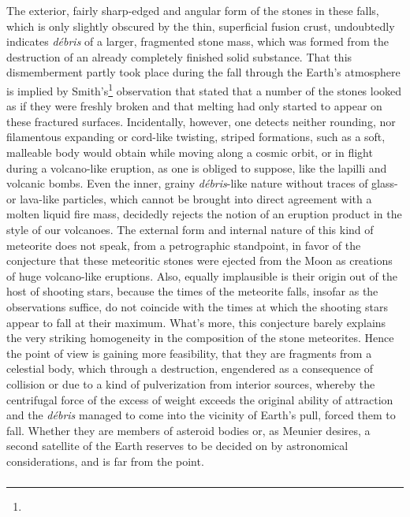 \documentclass[a4paper, 12pt, oneside]{article}
\begin{document}
The exterior, fairly sharp-edged and angular form of the stones in these falls, which is only slightly obscured by the thin, superficial fusion crust, undoubtedly indicates \emph{débris} of a larger, fragmented stone mass, which was formed from the destruction of an already completely finished solid substance. That this dismemberment partly took place during the fall through the Earth's atmosphere is implied by Smith's\footnote{} observation that stated that a number of the stones looked as if they were freshly broken and that melting had only started to appear on these fractured surfaces. Incidentally, however, one detects neither rounding, nor filamentous expanding or cord-like twisting, striped formations, such as a soft, malleable body would obtain while moving along a cosmic orbit, or in flight during a volcano-like eruption, as one is obliged to suppose, like the lapilli and volcanic bombs. Even the inner, grainy \emph{débris}-like nature without traces of glass- or lava-like particles, which cannot be brought into direct agreement with a molten liquid fire mass, decidedly rejects the notion of an eruption product in the style of our volcanoes. The external form and internal nature of this kind of meteorite does not speak, from a petrographic standpoint, in favor of the conjecture that these meteoritic stones were ejected from the Moon as creations of huge volcano-like eruptions. Also, equally implausible is their origin out of the host of shooting stars, because the times of the meteorite falls, insofar as the observations suffice, do not coincide with the times at which the shooting stars appear to fall at their maximum. What's more, this conjecture barely explains the very striking homogeneity in the composition of the stone meteorites. Hence the point of view is gaining more feasibility, that they are fragments from a celestial body, which through a destruction, engendered as a consequence of collision or due to a kind of pulverization from interior sources, whereby the centrifugal force of the excess of weight exceeds the original ability of attraction and the \emph{débris} managed to come into the vicinity of Earth's pull, forced them to fall. Whether they are members of asteroid bodies or, as Meunier desires, a second satellite of the Earth reserves to be decided on by astronomical considerations, and is far from the point.
\clearpage
\subsubsection{}
\end{document}
